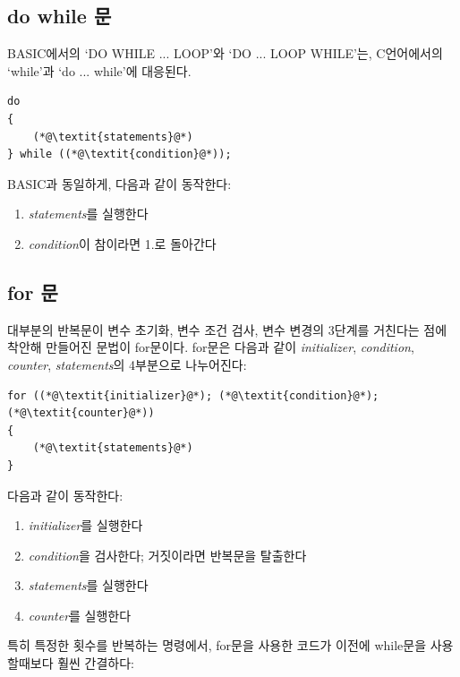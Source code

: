 \documentclass[a4paper,12pt]{book}
\begin{document}

\subsection{do while 문}

BASIC에서의 `DO WHILE ... LOOP'와 `DO ... LOOP WHILE'는,
C언어에서의 `while'과 `do ... while'에 대응된다.

\begin{lstlisting}
do
{
    (*@\textit{statements}@*)
} while ((*@\textit{condition}@*));
\end{lstlisting}

BASIC과 동일하게, 다음과 같이 동작한다:

\begin{enumerate}
    \item \textit{statements}를 실행한다
    \item \textit{condition}이 참이라면 1.로 돌아간다
\end{enumerate}


\subsection{for 문}

대부분의 반복문이 변수 초기화, 변수 조건 검사, 변수 변경의 3단계를
거친다는 점에 착안해 만들어진 문법이 for문이다.
for문은 다음과 같이 \textit{initializer}, \textit{condition},
\textit{counter}, \textit{statements}의 4부분으로 나누어진다:

\begin{lstlisting}
for ((*@\textit{initializer}@*); (*@\textit{condition}@*); (*@\textit{counter}@*))
{
    (*@\textit{statements}@*)
}
\end{lstlisting}

다음과 같이 동작한다:

\begin{enumerate}
    \item \textit{initializer}를 실행한다
    \item \textit{condition}을 검사한다; 거짓이라면 반복문을 탈출한다
    \item \textit{statements}를 실행한다
    \item \textit{counter}를 실행한다
\end{enumerate}

특히 특정한 횟수를 반복하는 명령에서,
for문을 사용한 코드가 이전에 while문을 사용할때보다
훨씬 간결하다:
\end{document}
